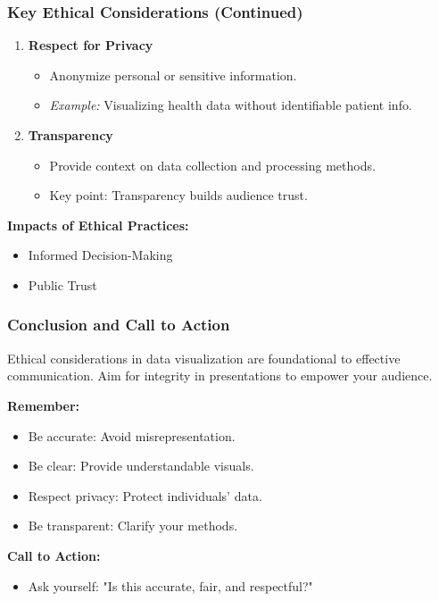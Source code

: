 \documentclass[aspectratio=169]{beamer}
\begin{document}
\begin{frame}[fragile]
  \frametitle{Key Ethical Considerations (Continued)}
  \begin{enumerate}[resume]
    \item \textbf{Respect for Privacy}
      \begin{itemize}
        \item Anonymize personal or sensitive information.
        \item \textit{Example:} Visualizing health data without identifiable patient info.
      \end{itemize}

    \item \textbf{Transparency}
      \begin{itemize}
        \item Provide context on data collection and processing methods.
        \item Key point: Transparency builds audience trust.
      \end{itemize}
  \end{enumerate}

  \vspace{1cm}
  \textbf{Impacts of Ethical Practices:}
  \begin{itemize}
    \item Informed Decision-Making
    \item Public Trust
  \end{itemize}
\end{frame}

\begin{frame}[fragile]
  \frametitle{Conclusion and Call to Action}
  Ethical considerations in data visualization are foundational to effective communication. Aim for integrity in presentations to empower your audience.

  \textbf{Remember:}
  \begin{itemize}
    \item Be accurate: Avoid misrepresentation.
    \item Be clear: Provide understandable visuals.
    \item Respect privacy: Protect individuals' data.
    \item Be transparent: Clarify your methods.
  \end{itemize}

  \textbf{Call to Action:}
  \begin{itemize}
    \item Ask yourself: "Is this accurate, fair, and respectful?"
  \end{itemize}
\end{frame}
\end{document}
